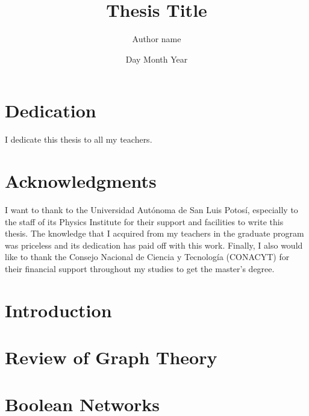 \documentclass[12pt,twoside]{report}
\title{Thesis Title}
\author{Author name}
\date{Day Month Year}
\begin{document}


\clearpage
\thispagestyle{empty}
\phantom{a}
\vfill
\newpage
\vfill



\clearpage
\thispagestyle{empty}
\phantom{a}
\vfill
\newpage
\vfill

\chapter*{Dedication}
{\LARGE
I dedicate this thesis to all my teachers.}


\chapter*{Acknowledgments}
I want to thank to the Universidad Autónoma de San Luis Potosí, especially to the staff of its Physics Institute for their support and facilities to write this thesis. The knowledge that I acquired from my teachers in the graduate program was priceless and its dedication has paid off with this work. Finally, I also would like to thank the Consejo Nacional de Ciencia y Tecnología (CONACYT) for their financial support throughout my studies to get the master's degree.

\tableofcontents

\listoffigures

\listoftables

\newpage\null\thispagestyle{blank}\newpage

\chapter{Introduction}


\chapter{Review of Graph Theory}


\chapter{Boolean Networks}

\end{document}
